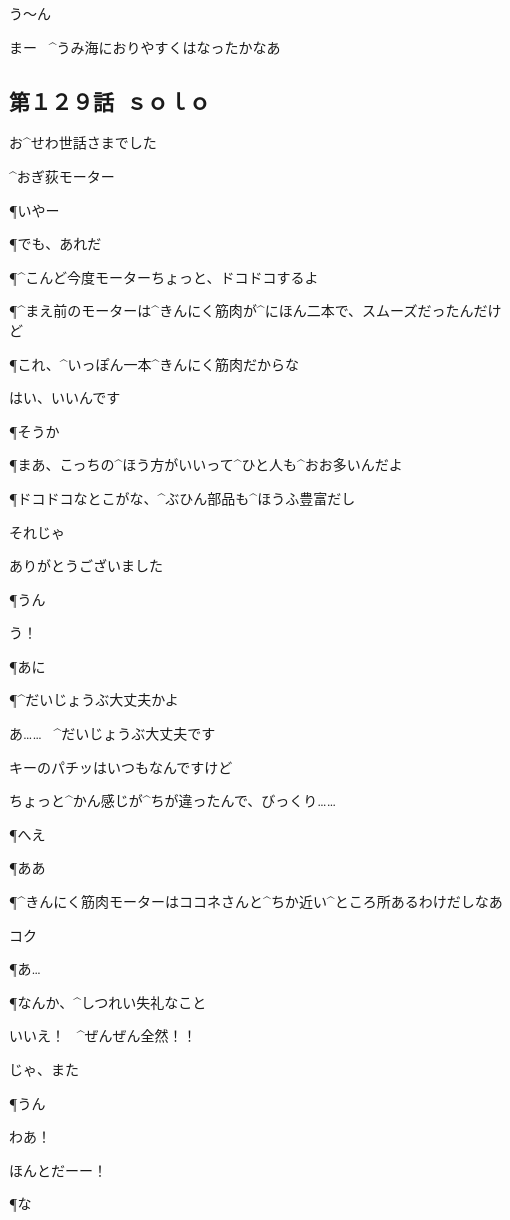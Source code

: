 \page
\A う〜ん

\A まー
\ ^{うみ}{海}におりやすくはなったかなあ


\subsection{第１２９話\ ｓｏｌｏ}

\page[132]
\K お^{せわ}{世話}さまでした

\Sign ^{おぎ}{荻}モーター

\P いやー

\P でも、あれだ

\P ^{こんど}{今度}モーターちょっと、ドコドコするよ

\P ^{まえ}{前}のモーターは^{きんにく}{筋肉}が^{にほん}{二本}で、スムーズだったんだけど

\P これ、^{いっぽん}{一本}^{きんにく}{筋肉}だからな

\K はい、いいんです

\page
\P そうか

\P まあ、こっちの^{ほう}{方}がいいって^{ひと}{人}も^{おお}{多}いんだよ

\P ドコドコなとこがな、^{ぶひん}{部品}も^{ほうふ}{豊富}だし

\K それじゃ

\K ありがとうございました

\P うん

\page
\K う！

\P あに

\P ^{だいじょうぶ}{大丈夫}かよ

\K あ……
\ ^{だいじょうぶ}{大丈夫}です

\K キーのパチッはいつもなんですけど

\K ちょっと^{かん}{感}じが^{ちが}{違}ったんで、びっくり……

\P へえ

\page
\P ああ

\P ^{きんにく}{筋肉}モーターはココネさんと^{ちか}{近}い^{ところ}{所}あるわけだしなあ

\K コク

\P あ…

\P なんか、^{しつれい}{失礼}なこと

\K いいえ！
\ ^{ぜんぜん}{全然}！！

\K じゃ、また

\P うん

\page
\K わあ！

\K ほんとだーー！

\P な

